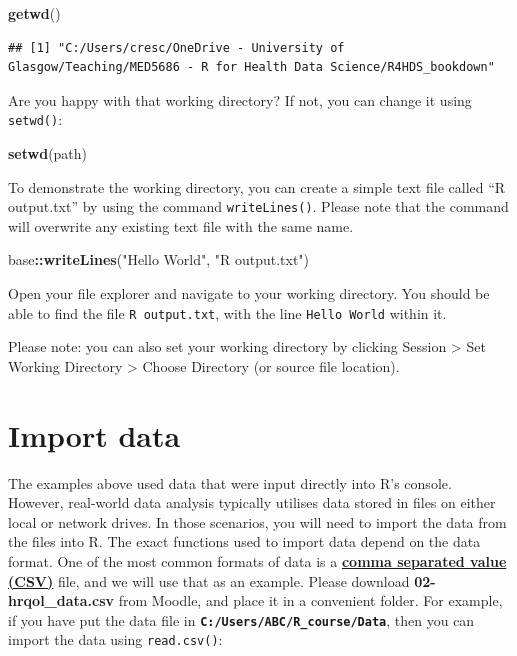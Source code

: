 \documentclass[
]{book}
\newenvironment{Shaded}{\begin{snugshade}}{\end{snugshade}}
\newcommand{\FunctionTok}[1]{\textcolor[rgb]{0.13,0.29,0.53}{\textbf{#1}}}
\newcommand{\NormalTok}[1]{#1}
\newcommand{\SpecialCharTok}[1]{\textcolor[rgb]{0.81,0.36,0.00}{\textbf{#1}}}
\newcommand{\StringTok}[1]{\textcolor[rgb]{0.31,0.60,0.02}{#1}}
\begin{document}
\begin{Shaded}
\begin{Highlighting}[]
\FunctionTok{getwd}\NormalTok{()}
\end{Highlighting}
\end{Shaded}

\begin{verbatim}
## [1] "C:/Users/cresc/OneDrive - University of Glasgow/Teaching/MED5686 - R for Health Data Science/R4HDS_bookdown"
\end{verbatim}

Are you happy with that working directory? If not, you can change it using \texttt{setwd()}:

\begin{Shaded}
\begin{Highlighting}[]
\FunctionTok{setwd}\NormalTok{(}\StringTok{\textquotesingle{}path\textquotesingle{}}\NormalTok{)}
\end{Highlighting}
\end{Shaded}

To demonstrate the working directory, you can create a simple text file called ``R output.txt'' by using the command \texttt{writeLines()}. Please note that the command will overwrite any existing text file with the same name.

\begin{Shaded}
\begin{Highlighting}[]
\NormalTok{base}\SpecialCharTok{::}\FunctionTok{writeLines}\NormalTok{(}\StringTok{"Hello World"}\NormalTok{, }\StringTok{"R output.txt"}\NormalTok{)}
\end{Highlighting}
\end{Shaded}

Open your file explorer and navigate to your working directory. You should be able to find the file \texttt{R\ output.txt}, with the line \texttt{Hello\ World} within it.

Please note: you can also set your working directory by clicking Session \textgreater{} Set Working Directory \textgreater{} Choose Directory (or source file location).

\section{Import data}\label{import-data}

The examples above used data that were input directly into R's console. However, real-world data analysis typically utilises data stored in files on either local or network drives. In those scenarios, you will need to import the data from the files into R. The exact functions used to import data depend on the data format. One of the most common formats of data is a \textbf{\hyperref[acronyms_CSV]{comma separated value (CSV)}} file, and we will use that as an example. Please download \textbf{02-hrqol\_data.csv} from Moodle, and place it in a convenient folder. For example, if you have put the data file in \textbf{\texttt{C:/Users/ABC/R\_course/Data}}, then you can import the data using \texttt{read.csv()}:
\end{document}
